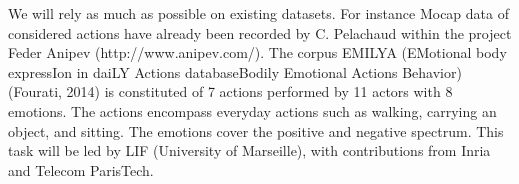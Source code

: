 We will rely as much as possible on existing datasets. For instance Mocap data of considered actions have already been recorded by C. Pelachaud within the project Feder Anipev (http://www.anipev.com/). The corpus EMILYA (EMotional body expressIon in daiLY Actions databaseBodily Emotional Actions Behavior) (Fourati, 2014) is constituted of 7 actions performed by 11 actors with 8 emotions. The actions encompass everyday actions such as walking, carrying an object, and sitting. The emotions cover the positive and negative spectrum. 
This task will be led by LIF (University of Marseille), with contributions from Inria and Telecom ParisTech.

\endinput